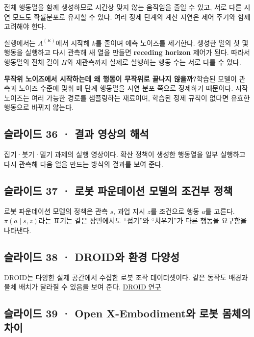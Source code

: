 \documentclass[11pt,a4paper]{article}
\begin{document}
전체 행동열을 함께 생성하므로 시간상 맞지 않는 움직임을 줄일 수 있고, 서로 다른 시연 모드도 확률분포로 유지할 수 있다. 여러 정제 단계의 계산 지연은 제어 주기와 함께 고려해야 한다.\par

실행에서는 $A^{(K)}$에서 시작해 $k$를 줄이며 예측 노이즈를 제거한다. 생성한 열의 첫 몇 행동을 실행하고 다시 관측해 새 열을 만들면 \textbf{receding horizon} 제어가 된다. 따라서 행동열의 전체 길이 $H$와 재관측까지 실제로 실행하는 행동 수는 서로 다를 수 있다.\par

\par\medskip\noindent\textbf{무작위 노이즈에서 시작하는데 왜 행동이 무작위로 끝나지 않을까?}\quad 학습된 모델이 관측과 노이즈 수준에 맞춰 매 단계 행동열을 시연 분포 쪽으로 정제하기 때문이다. 시작 노이즈는 여러 가능한 경로를 샘플링하는 재료이며, 학습된 정제 규칙이 없다면 유효한 행동으로 바뀌지 않는다.\par

\subsection{슬라이드 36 · 결과 영상의 해석}

집기·붓기·밀기 과제의 실행 영상이다. 확산 정책이 생성한 행동열을 일부 실행하고 다시 관측해 다음 열을 만드는 방식의 결과를 보여 준다.\par

\subsection{슬라이드 37 · 로봇 파운데이션 모델의 조건부 정책}

로봇 파운데이션 모델의 정책은 관측 $s$, 과업 지시 $z$를 조건으로 행동 $a$를 고른다. $\pi(a\mid s,z)$라는 표기는 같은 장면에서도 “접기”와 “치우기”가 다른 행동을 요구함을 나타낸다.\par

\subsection{슬라이드 38 · DROID와 환경 다양성}

DROID는 다양한 실제 공간에서 수집한 로봇 조작 데이터셋이다. 같은 동작도 배경과 물체 배치가 달라질 수 있음을 보여 준다. \href{https://arxiv.org/abs/2403.12945}{DROID 연구}\par

\subsection{슬라이드 39 · Open X-Embodiment와 로봇 몸체의 차이}
\end{document}
